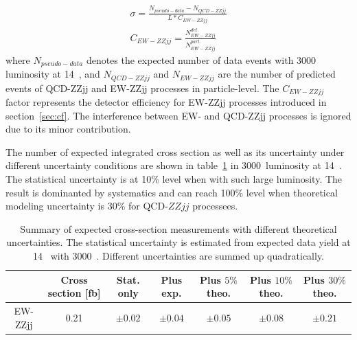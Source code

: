 \begin{equation}
\begin{split}
  \sigma = \frac{N_{pseudo-data} - N_{QCD-ZZjj}}{L*C_{EW-ZZjj}}\\
  C_{EW-ZZjj} = \frac{N_{EW-ZZjj}^{det.}}{N_{EW-ZZjj}^{part.}}
\end{split}
\end{equation}
where $N_{pseudo-data}$ denotes the expected number of data events with 3000~\ifb{} luminosity at 14~\tev,
and $N_{QCD-ZZjj}$ and $N_{EW-ZZjj}$ are the number of predicted events of QCD-ZZjj and EW-ZZjj processes in particle-level.
The $C_{EW-ZZjj}$ factor represents the detector efficiency for EW-ZZjj processes introduced in section~\ref{sec:cf}.
The interference between EW- and QCD-ZZjj processes is ignored due to its minor contribution.

The number of expected integrated cross section as well as its uncertainty under different uncertainty conditions are shown in table~\ref{tab:xsec}
in 3000~\ifb luminosity at 14~\tev.
The statistical uncertainty is at 10\% level when with such large luminosity.
The result is dominanted by systematics and can reach 100\% level when theoretical modeling uncertainty is 30\% for QCD-$ZZjj$ processees.
\begin{table}[htbp]
  \small
  \centering
  \begin{tabular}{c|c|c|c|c|c|c}
    \hline
     & Cross section [fb] & Stat. only & Plus exp. & Plus $5\%$ theo. & Plus $10\%$ theo. & Plus $30\%$ theo. \\
    \hline
    EW-ZZjj & 0.21 & $\pm0.02$ & $\pm0.04$ & $\pm0.05$ & $\pm 0.08$ & $\pm 0.21$ \\
    \hline
  \end{tabular}
  \caption{
  Summary of expected cross-section measurements with different theoretical uncertainties.
  The statistical uncertainty is estimated from expected data yield at 14~\TeV{} with 3000~\ifb.
  Different uncertainties are summed up quadratically.
  }
  \label{tab:xsec}
\end{table}

